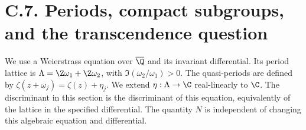 \section{C.7. Periods, compact subgroups, and the transcendence question}

We use a Weierstrass equation over $\overline\Q$ and its invariant
differential. Its period lattice is $\Lambda=\Z\omega_1+\Z\omega_2$,
with $\Im(\omega_2/\omega_1)>0$. The quasi-periods are defined by
$\zeta(z+\omega_j)=\zeta(z)+\eta_j$. We extend
$\eta:\Lambda\to\C$ real-linearly to $\C$. The discriminant in
this section is the discriminant of this equation, equivalently of
the lattice in the specified differential. The quantity $N$ is
independent of changing this algebraic equation and differential.

